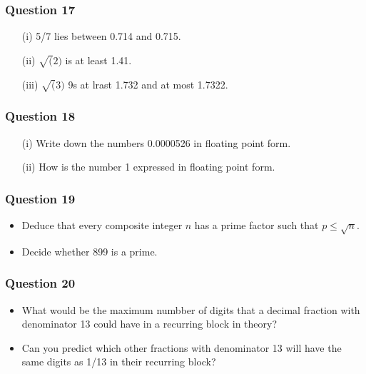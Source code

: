 \documentclass[]{report}
\begin{document}
\begin{enumerate}
\subsubsection*{Question 17}
\begin{enumerate}
\item[(i)] 5/7 lies between 0.714 and 0.715.
\item[(ii)] $\sqrt(2)$ is at least 1.41.
\item[(iii)] $\sqrt(3)$  9s at lrast 1.732 and at most 1.7322.
\end{enumerate}


\subsubsection*{Question 18}
\begin{itemize}
\item[(i)] Write down the numbers 0.0000526 in floating point form.
\item[(ii)] How is the number 1 expressed in floating point form.
\end{itemize}


\subsubsection*{Question 19}
\begin{itemize}
\item Deduce that every composite integer $n$ has a prime factor such that $p \leq \sqrt{n}$.
\item Decide whether 899 is a prime.
\end{itemize}

\subsubsection*{Question 20}

\begin{itemize}
\item What would be the maximum numbber of digits that a decimal fraction with denominator 13 
could have in a recurring block in theory?

\item Can you predict which other fractions with denominator 13 will have the same digits as 1/13 in their recurring block?
\end{itemize}




\end{enumerate}
\end{document}
